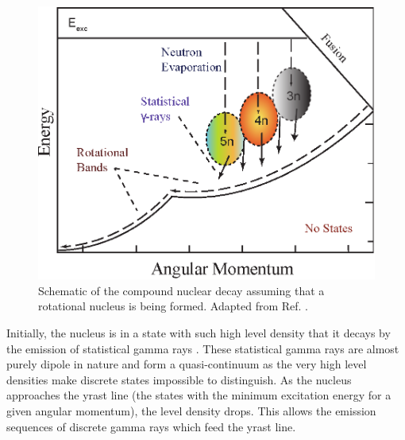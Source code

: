 \begin{figure}[h!]
	\centerline{\includegraphics[height=0.3\textheight]{./img/c3/evaporation_chans.eps}}
	\caption{Schematic of the compound nuclear decay assuming that a rotational nucleus is being formed. Adapted from Ref. \cite{danielDissertation}.\label{fig:chp3-emission-schematic}}
\end{figure}

Initially, the nucleus is in a state with such high level density that it decays by the emission of statistical gamma rays \cite{cnCooling}. These statistical gamma rays are almost purely dipole in nature and form a quasi-continuum as the very high level densities make discrete states impossible to distinguish. As the nucleus approaches the yrast line (the states with the minimum excitation energy for a given angular momentum), the level density drops. This allows the emission sequences of discrete gamma rays which feed the yrast line.

